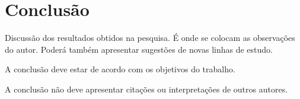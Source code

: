 \section{\esp Conclusão}

Discussão dos resultados obtidos na pesquisa. É onde se colocam as observações do autor. 
Poderá também apresentar sugestões de novas linhas de estudo.

A conclusão deve estar de acordo com os objetivos do trabalho.

A conclusão não deve apresentar citações ou interpretações de outros autores.
